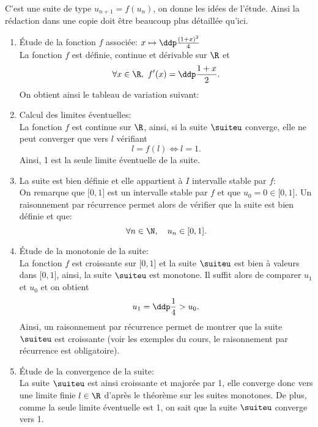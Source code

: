 
\begin{correction} \;
C'est une suite de type $u_{n+1}=f(u_n)$, on donne les id\'ees de l'\'etude. Ainsi la r\'edaction dans une copie doit \^{e}tre beaucoup plus d\'etaill\'ee qu'ici.
\begin{enumerate}
 \item \'Etude de la fonction $f$ associ\'ee: $x\mapsto \ddp\frac{(1+x)^2}{4}$\\
\noindent La fonction $f$ est d\'efinie, continue et d\'erivable sur $\R$ et 
$$\forall x\in\R,\ f^{\prime}(x)=\ddp\frac{1+x}{2}.$$
On obtient ainsi le tableau de variation suivant:
\begin{center}
\end{center}
\item Calcul des limites \'eventuelles:\\
\noindent La fonction $f$ est continue sur $\R$, ainsi, si la suite $\suiteu$ converge, elle ne peut converger que vers $l$ v\'erifiant 
$$l=f(l)\Leftrightarrow l=1.$$
Ainsi, 1 est la seule limite \'eventuelle de la suite.
\item La suite est bien d\'efinie et elle appartient \`{a} $I$ intervalle stable par $f$:\\
\noindent On remarque que $\lbrack 0,1\rbrack$ est un intervalle stable par $f$ et que $u_0=0\in\lbrack 0,1\rbrack$. Un raisonnement par r\'ecurrence permet alors de v\'erifier que la suite est bien d\'efinie et que:
$$\forall n\in\N,\quad u_n\in\lbrack 0,1\rbrack.$$
\noindent 
\item \'Etude de la monotonie de la suite:\\
La fonction $f$ est croissante sur $\lbrack 0,1\rbrack$ et la suite $\suiteu$ est bien \`a valeurs dans $\lbrack 0,1\rbrack$, ainsi, la suite $\suiteu$ est monotone. Il suffit alors de comparer $u_1$ et $u_0$ et on obtient
$$u_1=\ddp\frac{1}{4}>u_0.$$
Ainsi, un raisonnement par r\'ecurrence permet de montrer que la suite $\suiteu$ est croissante (voir les exemples du cours, le raisonnement par r\'ecurrence est obligatoire).
\noindent 
\item \'Etude de la convergence de la suite:\\
\noindent La suite $\suiteu$ est ainsi croissante et major\'ee par 1, elle converge donc vers une limite finie $l\in\R$ d'apr\`es le th\'eor\`eme sur les suites monotones. De plus, comme la seule limite \'eventuelle est 1, on sait que la suite $\suiteu$ converge vers 1.
\end{enumerate}
\end{correction}